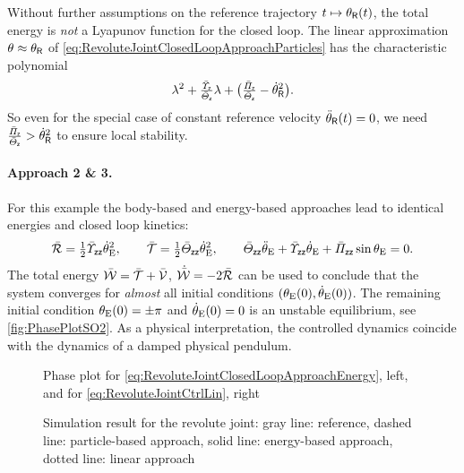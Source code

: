 Without further assumptions on the reference trajectory $t \mapsto \theta_{\mathsf{R}}(t)$, the total energy is \textit{not} a Lyapunov function for the closed loop.
The linear approximation $\theta_{} \approx \theta_{\mathsf{R}}$ of \eqref{eq:RevoluteJointClosedLoopApproachParticles} has the characteristic polynomial
\begin{align}
 \lambda^2 + \tfrac{\bar{\varUpsilon}_{\mathsf{z}}}{\bar{\varTheta}_{\mathsf{z}}} \lambda + \big( \tfrac{\bar{\varPi}_{\mathsf{z}}}{\bar{\varTheta}_{\mathsf{z}}} - \dot{\theta}_{\mathsf{R}}^2 \big).
\end{align}
So even for the special case of constant reference velocity $\ddot{\theta}_{\mathsf{R}}(t) = 0$, we need $\tfrac{\bar{\varPi}_{\mathsf{z}}}{\bar{\varTheta}_{\mathsf{z}}} > \dot{\theta}_{\mathsf{R}}^2$ to ensure local stability.

\paragraph{Approach 2 \& 3.}
For this example the body-based and energy-based approaches lead to identical energies and closed loop kinetics:
\begin{align}
 \bar{\mathcal{R}} = \tfrac{1}{2} \bar{\varUpsilon}_{\mathsf{z}\mathsf{z}} \dot{\theta}_{\mathrm{E}}^2,
\qquad
 \bar{\mathcal{T}} = \tfrac{1}{2} \bar{\varTheta}_{\mathsf{z}\mathsf{z}} \dot{\theta}_{\mathrm{E}}^2,
\qquad
 \bar{\varTheta}_{\mathsf{z}\mathsf{z}} \ddot{\theta}_{\mathrm{E}} + \bar{\varUpsilon}_{\mathsf{z}\mathsf{z}} \dot{\theta}_{\mathrm{E}} + \bar{\varPi}_{\mathsf{z}\mathsf{z}} \sin \theta_{\mathrm{E}} = 0.
\label{eq:RevoluteJointClosedLoopApproachEnergy}
\end{align}
The total energy $\bar{\mathcal{W}} = \bar{\mathcal{T}} + \bar{\mathcal{V}}$, $\dot{\bar{\mathcal{W}}} = -2\bar{\mathcal{R}}$ can be used to conclude that the system converges for \textit{almost} all initial conditions $(\theta_{\mathrm{E}}(0), \dot{\theta}_{\mathrm{E}}(0))$.
The remaining initial condition $\theta_{\mathrm{E}}(0) = \pm\pi$ and $\dot{\theta}_{\mathrm{E}}(0)=0$ is an unstable equilibrium, see \autoref{fig:PhasePlotSO2}.
As a physical interpretation, the controlled dynamics coincide with the dynamics of a damped physical pendulum.

\begin{figure}
 \centering
 
 \caption{Phase plot for \eqref{eq:RevoluteJointClosedLoopApproachEnergy}, left, and for \eqref{eq:RevoluteJointCtrlLin}, right}
 \label{fig:PhasePlotSO2}
\end{figure}
\begin{figure}
 \centering
 
 \caption{Simulation result for the revolute joint: gray line: reference, dashed line: particle-based approach, solid line: energy-based approach, dotted line: linear approach}
 \label{fig:RevoluteJointSimRes}
\end{figure}


